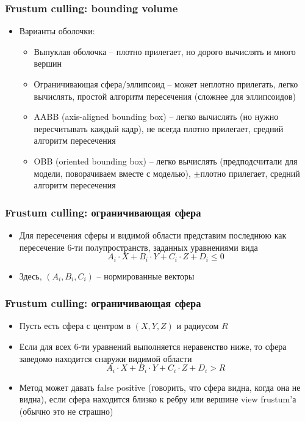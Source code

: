 \documentclass{beamer}
\begin{document}
\begin{frame}[fragile]
\frametitle{Frustum culling: bounding volume}
\begin{itemize}
\item Варианты оболочки:
\pause
\begin{itemize}
\item Выпуклая оболочка -- плотно прилегает, но дорого вычислять и много вершин
\pause
\item Ограничивающая сфера/эллипсоид -- может неплотно прилегать, легко вычислять, простой алгоритм пересечения (сложнее для эллипсоидов)
\pause
\item AABB (axis-aligned bounding box) -- легко вычислять (но нужно пересчитывать каждый кадр), не всегда плотно прилегает, средний алгоритм пересечения
\pause
\item OBB (oriented bounding box) -- легко вычислять (предподсчитали для модели, поворачиваем вместе с моделью), \begin{math}\pm\end{math}плотно прилегает, средний алгоритм пересечения
\end{itemize}
\end{itemize}
\end{frame}

\begin{frame}[fragile]
\frametitle{Frustum culling: ограничивающая сфера}
\begin{itemize}
\item Для пересечения сферы и видимой области представим последнюю как пересечение 6-ти полупространств, заданных уравнениями вида
\begin{equation*}
A_i \cdot X + B_i \cdot Y + C_i \cdot Z + D_i \leq 0
\end{equation*}
\pause
\item Здесь, \begin{math}(A_i,B_i,C_i)\end{math} -- нормированные векторы
\end{itemize}
\end{frame}

\begin{frame}[fragile]
\frametitle{Frustum culling: ограничивающая сфера}
\begin{itemize}
\item Пусть есть сфера с центром в \begin{math}(X,Y,Z)\end{math} и радиусом \begin{math}R\end{math}
\pause
\item Если для всех 6-ти уравнений выполняется неравенство ниже, то сфера заведомо находится снаружи видимой области
\begin{equation*}
A_i \cdot X + B_i \cdot Y + C_i \cdot Z + D_i > R
\end{equation*}
\pause
\item Метод может давать false positive (говорить, что сфера видна, когда она не видна), если сфера находится близко к ребру или вершине view frustum'а (обычно это не страшно)
\end{itemize}
\end{frame}
\end{document}
